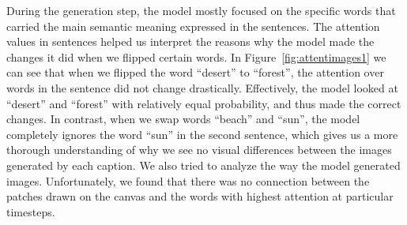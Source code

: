 \documentclass{article} %
\begin{document}

During the generation step, the model mostly focused on the specific words that carried the main semantic meaning expressed in the sentences. The attention values in sentences helped us interpret the reasons why the model made the changes it did when we flipped certain words. In Figure~\ref{fig:attentimages1} we can see that when we flipped the word ``desert'' to ``forest'', the attention over words in the sentence did not change drastically. Effectively, the model looked at ``desert'' and ``forest'' with relatively equal probability, and thus made the correct changes. In contrast, when we swap words ``beach'' and ``sun'', the model completely ignores the word ``sun'' in the second sentence, which gives us a more thorough understanding of why we see no visual differences between the images generated by each caption. We also tried to analyze the way the model generated images. Unfortunately, we found that there was no connection between the patches drawn on the canvas and the words with highest attention at particular timesteps.

\end{document}
